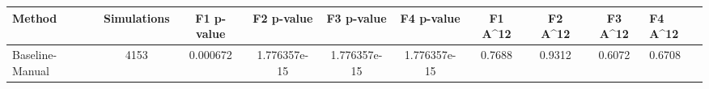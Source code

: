 \begin{tabular}{lcccccccc}
\toprule
         Method &  Simulations &  F1 p-value &   F2 p-value &   F3 p-value &   F4 p-value &  F1 A^12 &  F2 A^12 &  F3 A^12 &  F4 A^12 \\
\midrule
Baseline-Manual &         4153 &    0.000672 & 1.776357e-15 & 1.776357e-15 & 1.776357e-15 &   0.7688 &   0.9312 &   0.6072 &   0.6708 \\
\bottomrule
\end{tabular}
